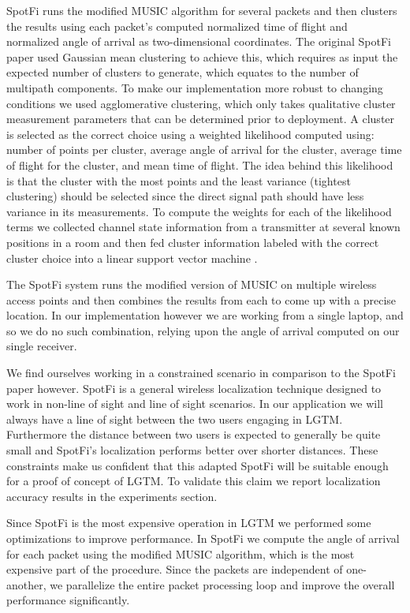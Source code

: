 \documentclass[12pt]{report}
\begin{document}
SpotFi runs the modified MUSIC algorithm for several packets and then clusters the results using each packet's computed normalized time of flight and normalized angle of arrival as two-dimensional coordinates. The original SpotFi paper used Gaussian mean clustering to achieve this, which requires as input the expected number of clusters to generate, which equates to the number of multipath components. To make our implementation more robust to changing conditions we used agglomerative clustering, which only takes qualitative cluster measurement parameters that can be determined prior to deployment. A cluster is selected as the correct choice using a weighted likelihood computed using: number of points per cluster, average angle of arrival for the cluster, average time of flight for the cluster, and mean time of flight. The idea behind this likelihood is that the cluster with the most points and the least variance (tightest clustering) should be selected since the direct signal path should have less variance in its measurements. To compute the weights for each of the likelihood terms we collected channel state information from a transmitter at several known positions in a room and then fed cluster information labeled with the correct cluster choice into a linear support vector machine \cite{SvmTutorialBurges1998}. \par

The SpotFi system runs the modified version of MUSIC on multiple wireless access points and then combines the results from each to come up with a precise location. In our implementation however we are working from a single laptop, and so we do no such combination, relying upon the angle of arrival computed on our single receiver. \par

We find ourselves working in a constrained scenario in comparison to the SpotFi paper however. SpotFi is a general wireless localization technique designed to work in non-line of sight and line of sight scenarios. In our application we will always have a line of sight between the two users engaging in LGTM. Furthermore the distance between two users is expected to generally be quite small and SpotFi's localization performs better over shorter distances. These constraints make us confident that this adapted SpotFi will be suitable enough for a proof of concept of LGTM. To validate this claim we report localization accuracy results in the experiments section. \par

Since SpotFi is the most expensive operation in LGTM we performed some optimizations to improve performance. In SpotFi we compute the angle of arrival for each packet using the modified MUSIC algorithm, which is the most expensive part of the procedure. Since the packets are independent of one-another, we parallelize the entire packet processing loop and improve the overall performance significantly. \par
\end{document}
